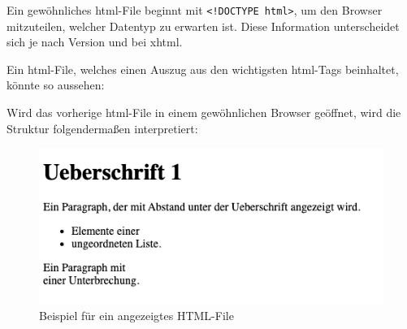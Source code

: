 Ein gewöhnliches \gls{html}-File beginnt mit \lstinline{<!DOCTYPE html>}, um den Browser mitzuteilen, welcher Datentyp zu erwarten ist. Diese Information unterscheidet sich je nach Version und bei \gls{xhtml}. \cite{DOCTYPE}

Ein \gls{html}-File, welches einen Auszug aus den wichtigsten \gls{html}-Tags beinhaltet, könnte so aussehen:



Wird das vorherige \gls{html}-File in einem gewöhnlichen Browser geöffnet, wird die Struktur folgendermaßen interpretiert:

\begin{figure}[H]
    \centering
    \includegraphics[scale=0.8]{sections/implementation/images/DemoApp.png}
    \caption{Beispiel für ein angezeigtes HTML-File}
\end{figure}